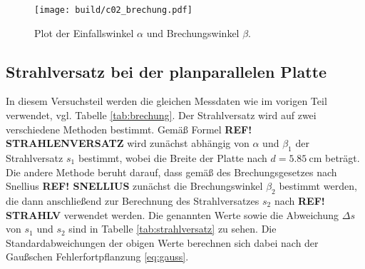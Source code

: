 \begin{figure}[H]
    \centering
    \texttt{[image: build/c02\_brechung.pdf]}
    \caption[]{Plot der Einfallswinkel $\alpha$ und Brechungswinkel $\beta$.}
    \label{fig:brechung}
\end{figure}






\subsection{Strahlversatz bei der planparallelen Platte}
In diesem Versuchsteil werden die gleichen Messdaten wie im vorigen Teil verwendet, vgl. Tabelle \ref{tab:brechung}.
Der Strahlversatz wird auf zwei verschiedene Methoden bestimmt.
Gemäß Formel \textbf{REF! STRAHLENVERSATZ} wird zunächst abhängig von $\alpha$ und $\beta_1$ der Strahlversatz $s_1$ bestimmt,
wobei die Breite der Platte nach \cite[]{man:v400} $d = \qty[]{5.85}{\cm}$ beträgt.
Die andere Methode beruht darauf, dass gemäß des Brechungsgesetzes nach Snellius \textbf{REF! SNELLIUS} zunächst die Brechungswinkel
$\beta_2$ bestimmt werden, die dann anschließend zur Berechnung des Strahlversatzes $s_2$ nach \textbf{REF! STRAHLV} verwendet werden.
Die genannten Werte sowie die Abweichung $\Delta s$ von $s_1$ und $s_2$ sind in Tabelle \ref{tab:strahlversatz} zu sehen.
Die Standardabweichungen der obigen Werte berechnen sich dabei nach der Gaußschen Fehlerfortpflanzung \eqref{eq:gauss}.

